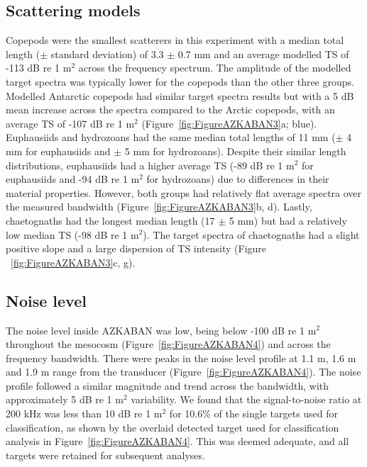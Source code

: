 \subsection{Scattering models}
Copepods were the smallest scatterers in this experiment with a median total length ($\pm$ standard deviation) of 3.3 $\pm$ 0.7 mm and an average modelled TS of -113 dB re 1 m$^2$ across the frequency spectrum. The amplitude of the modelled target spectra was typically lower for the copepods than the other three groups. Modelled Antarctic copepods had similar target spectra results but with a 5 dB mean increase across the spectra compared to the Arctic copepods, with an average TS of -107 dB re 1 m$^2$ (Figure~\ref{fig:FigureAZKABAN3}a; blue).\\
Euphausiids and hydrozoans had the same median total lengths of 11 mm ($\pm$  4 mm for euphausiids and $\pm$ 5 mm for hydrozoans). Despite their similar length distributions, euphausiids had a higher average TS (-89 dB re 1 m$^2$ for euphausiids and -94 dB re 1 m$^2$ for hydrozoans) due to differences in their material properties. However, both groups had relatively flat average spectra over the measured bandwidth (Figure~\ref{fig:FigureAZKABAN3}b, d). Lastly, chaetognaths had the longest median length (17 $\pm$ 5 mm) but had a relatively low median TS (-98 dB re 1 m$^2$). The target spectra of chaetognaths had a slight positive slope and a large dispersion of TS intensity (Figure ~\ref{fig:FigureAZKABAN3}c, g).


\subsection{Noise level}
The noise level inside AZKABAN was low, being below -100 dB re 1 m$^2$ throughout the mesocosm (Figure~\ref{fig:FigureAZKABAN4}) and across the frequency bandwidth. There were peaks in the noise level profile at 1.1 m, 1.6 m and 1.9 m range from the transducer (Figure~\ref{fig:FigureAZKABAN4}). The noise profile followed a similar magnitude and trend across the bandwidth, with approximately 5 dB re 1 m$^2$ variability. We found that the signal-to-noise ratio at 200 kHz was less than 10 dB re 1 m$^2$ for 10.6\% of the single targets used for classification, as shown by the overlaid detected target used for classification analysis in Figure~\ref{fig:FigureAZKABAN4}. This was deemed adequate, and all targets were retained for subsequent analyses.\\

